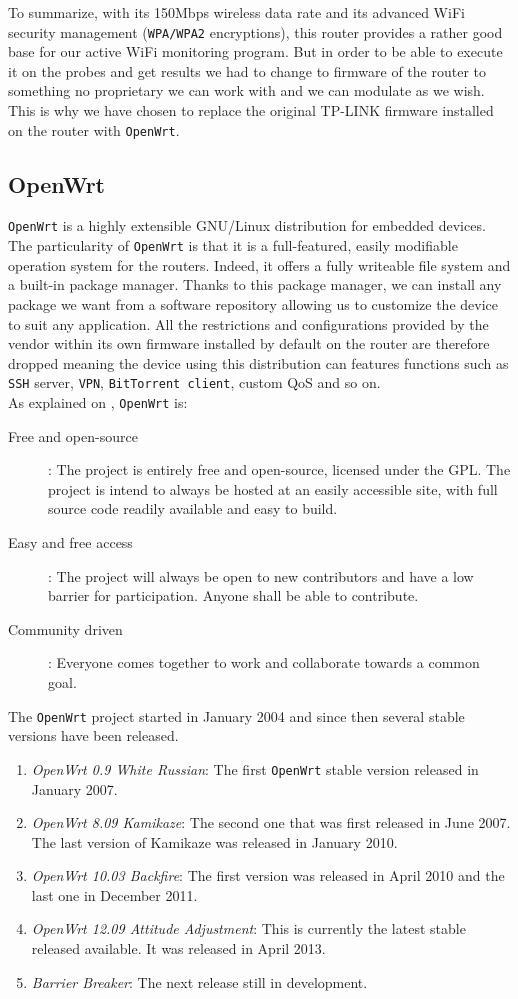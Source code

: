 To summarize, with its 150Mbps wireless data rate and its advanced WiFi security management (\texttt{WPA/WPA2} encryptions), this router provides a rather good base for our active WiFi monitoring program. But in order to be able to execute it on the probes and get results we had to change to firmware of the router to something no proprietary we can work with and we can modulate as we wish. This is why we have chosen to replace the original TP-LINK firmware installed on the router with \texttt{OpenWrt}.


\subsection{OpenWrt}
\texttt{OpenWrt} is a highly extensible GNU/Linux distribution for embedded devices. The particularity of \texttt{OpenWrt} is that it is a full-featured, easily modifiable operation system for the routers. Indeed, it offers a fully writeable file system and a built-in package manager. Thanks to this package manager, we can install any package we want from a software repository allowing us to customize the device to suit any application. All the restrictions and configurations provided by the vendor within its own firmware installed by default on the router are therefore dropped meaning the device using this distribution can features functions such as \texttt{SSH} server, \texttt{VPN}, \texttt{BitTorrent client}, custom QoS and so on.\\
As explained on \cite{openwrt}, \texttt{OpenWrt} is:
\begin{description}
	\item [Free and open-source]: The project is entirely free and open-source, licensed under the GPL. The project is intend to always be hosted at an easily accessible site, with full source code readily available and easy to build.
	\item [Easy and free access]: The project will always be open to new contributors and have a low barrier for participation. Anyone shall be able to contribute.
	\item [Community driven]: Everyone comes together to work and collaborate towards a common goal.
\end{description}

The \texttt{OpenWrt} project started in January 2004 and since then several stable versions have been released.
\begin{enumerate}
	\item \textit{OpenWrt 0.9 White Russian}: The first \texttt{OpenWrt} stable version released in January 2007.
	\item \textit{OpenWrt 8.09 Kamikaze}: The second one that was first released in June 2007. The last version of Kamikaze was released in January 2010.
	\item \textit{OpenWrt 10.03 Backfire}: The first version was released in April 2010 and the last one in December 2011.
	\item \textit{OpenWrt 12.09 Attitude Adjustment}: This is currently the latest stable released available. It was released in April 2013.
	\item \textit{Barrier Breaker}: The next release still in development.
\end{enumerate}

